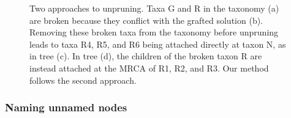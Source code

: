 \documentclass[fleqn,12pt,lineno,english]{wlpeerj}
\begin{document}
\begin{figure}
\begin{centering}
\hfill{}\hfill{}
\par\end{centering}
\begin{centering}
\hfill{}
\par\end{centering}
\caption{\label{fig:Two-approaches-to-unpruning}Two approaches to unpruning.
Taxa G and R in the taxonomy (a) are broken because they conflict
with the grafted solution (b). Removing these broken taxa from the
taxonomy before unpruning leads to taxa R4, R5, and R6 being attached
directly at taxon N, as in tree (c). In tree (d), the children of
the broken taxon R are instead attached at the MRCA of R1, R2, and
R3. Our method follows the second approach.}
\end{figure}


\subsubsection{Naming unnamed nodes}
\end{document}
